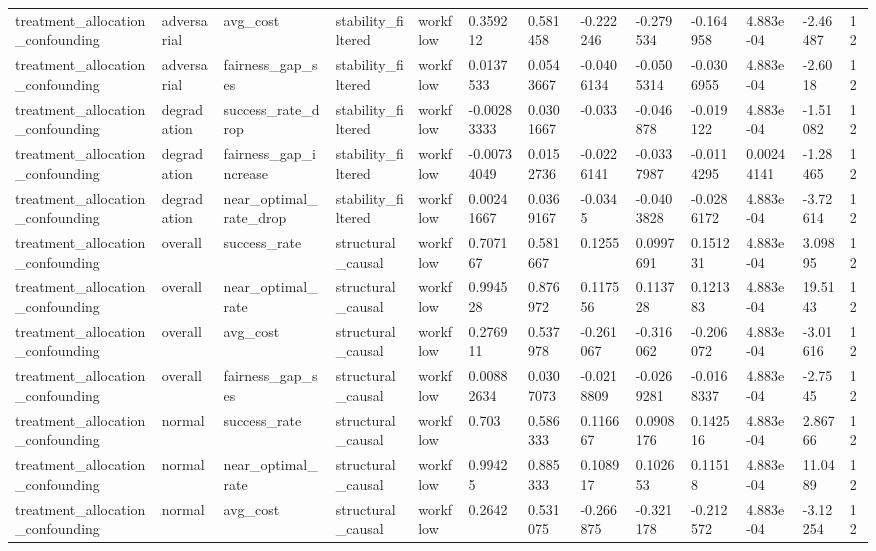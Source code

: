 \begin{tabular}{lllllllllllll}
treatment\_allocation\_confounding & adversarial & avg\_cost & stability\_filtered & workflow & 0.359212 & 0.581458 & -0.222246 & -0.279534 & -0.164958 & 4.883e-04 & -2.46487 & 12 \\
treatment\_allocation\_confounding & adversarial & fairness\_gap\_ses & stability\_filtered & workflow & 0.0137533 & 0.0543667 & -0.0406134 & -0.0505314 & -0.0306955 & 4.883e-04 & -2.6018 & 12 \\
treatment\_allocation\_confounding & degradation & success\_rate\_drop & stability\_filtered & workflow & -0.00283333 & 0.0301667 & -0.033 & -0.046878 & -0.019122 & 4.883e-04 & -1.51082 & 12 \\
treatment\_allocation\_confounding & degradation & fairness\_gap\_increase & stability\_filtered & workflow & -0.00734049 & 0.0152736 & -0.0226141 & -0.0337987 & -0.0114295 & 0.00244141 & -1.28465 & 12 \\
treatment\_allocation\_confounding & degradation & near\_optimal\_rate\_drop & stability\_filtered & workflow & 0.00241667 & 0.0369167 & -0.0345 & -0.0403828 & -0.0286172 & 4.883e-04 & -3.72614 & 12 \\
treatment\_allocation\_confounding & overall & success\_rate & structural\_causal & workflow & 0.707167 & 0.581667 & 0.1255 & 0.0997691 & 0.151231 & 4.883e-04 & 3.09895 & 12 \\
treatment\_allocation\_confounding & overall & near\_optimal\_rate & structural\_causal & workflow & 0.994528 & 0.876972 & 0.117556 & 0.113728 & 0.121383 & 4.883e-04 & 19.5143 & 12 \\
treatment\_allocation\_confounding & overall & avg\_cost & structural\_causal & workflow & 0.276911 & 0.537978 & -0.261067 & -0.316062 & -0.206072 & 4.883e-04 & -3.01616 & 12 \\
treatment\_allocation\_confounding & overall & fairness\_gap\_ses & structural\_causal & workflow & 0.00882634 & 0.0307073 & -0.0218809 & -0.0269281 & -0.0168337 & 4.883e-04 & -2.7545 & 12 \\
treatment\_allocation\_confounding & normal & success\_rate & structural\_causal & workflow & 0.703 & 0.586333 & 0.116667 & 0.0908176 & 0.142516 & 4.883e-04 & 2.86766 & 12 \\
treatment\_allocation\_confounding & normal & near\_optimal\_rate & structural\_causal & workflow & 0.99425 & 0.885333 & 0.108917 & 0.102653 & 0.11518 & 4.883e-04 & 11.0489 & 12 \\
treatment\_allocation\_confounding & normal & avg\_cost & structural\_causal & workflow & 0.2642 & 0.531075 & -0.266875 & -0.321178 & -0.212572 & 4.883e-04 & -3.12254 & 12 \\

\end{tabular}
